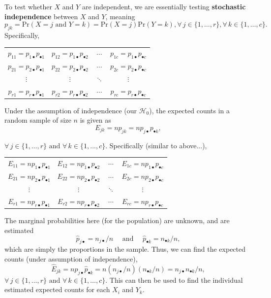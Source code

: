 \documentclass[12pt]{article}
\begin{document}
To test whether $X$ and $Y$ are independent, we are essentially testing \textbf{stochastic independence} between $X$ and $Y$, meaning \[p_{jk} = \text{Pr}(X = j \text{ and } Y = k) = \text{Pr}(X=j)\text{Pr}(Y = k), \forall\, j \in \{1, \dots, r\}, \forall \,k \in \{1, \dots, c\}.\] Specifically,
\begin{center}
    \begin{tabular}{c c c c}
        $p_{11} = p_{1\bullet}p_{\bullet 1}$ & $p_{12} = p_{1\bullet}p_{\bullet 2}$ & $\cdots$ & $p_{1c} = p_{1\bullet}p_{\bullet c}$\\
        $p_{21} = p_{2\bullet}p_{\bullet 1}$ & $p_{22} = p_{2\bullet}p_{\bullet 2}$ & $\cdots$ & $p_{2c} = p_{2\bullet}p_{\bullet c}$\\
        $\vdots$ & $\vdots$ & $\ddots$ & $\vdots$\\
        $p_{r1} = p_{r\bullet}p_{\bullet 1}$ & $p_{r2} = p_{r\bullet}p_{\bullet 2}$ & $\cdots$ & $p_{rc} = p_{r\bullet}p_{\bullet c}$\\
    \end{tabular}
\end{center}

Under the assumption of independence (our $\mathcal{H}_0$), the expected counts in a random sample of size $n$ is given as \[E_{jk} = np_{jk} = np_{j\bullet}p_{\bullet k},\] 

$\forall \, j \in\{1, \dots,r\} \text{ and } \forall \, k \in \{1, \dots, c\}.$ Specifically (similar to above...), 

\begin{center}
    \begin{tabular}{c c c c}
       $E_{11} = np_{1\bullet}p_{\bullet 1}$ & $E_{12} = np_{1\bullet}p_{\bullet 2}$ & $\cdots$ & $E_{1c} = np_{1\bullet}p_{\bullet c}$\\
        $E_{21} = np_{2\bullet}p_{\bullet 1}$ & $E_{22} = np_{2\bullet}p_{\bullet 2}$ & $\cdots$ & $E_{2c} = np_{2\bullet}p_{\bullet c}$\\
        $\vdots$ & $\vdots$ & $\ddots$ & $\vdots$\\
        $E_{r1} = np_{r\bullet}p_{\bullet 1}$ & $E_{r2} = np_{r\bullet}p_{\bullet 2}$ & $\cdots$ & $E_{rc} = np_{r\bullet}p_{\bullet c}$\\
    \end{tabular}
\end{center}

The marginal probabilities here (for the population) are unknown, and are estimated \[\hat{p}_{j\bullet} = n_{j\bullet} / n \quad \text{ and } \quad \hat{p}_{\bullet k} = n_{\bullet k}/n,\] which are simply the proportions in the sample. Thus, we can find the expected counts (under assumption of independence), \[\hat{E}_{jk} = n \hat{p}_{j\bullet} \hat{p}_{\bullet k} = n(n_{j\bullet}/n)(n_{\bullet k}/n) = n_{j\bullet}n_{\bullet k}/n,\] $\forall \, j \in \{1, \dots, r\} \text{ and } \forall \, k \in \{1, \dots, c\}$. This can then be used to find the individual estimated expected counts for each $X_i$ and $Y_k$.
\end{document}
